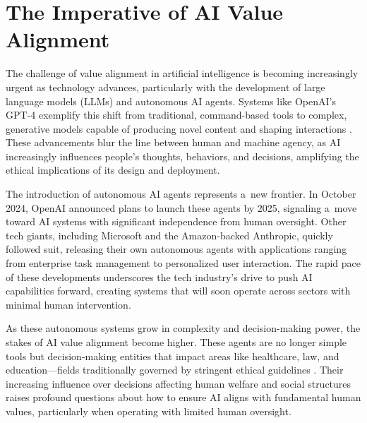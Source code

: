 \documentclass[%
  manuscript=article,
  year=2024,
  volume=77,
  doi=10.59203/zfn.77.707,
]{zfn}
\begin{document}
\section{The Imperative of AI Value Alignment}

The challenge of value alignment in artificial intelligence is becoming increasingly urgent as technology advances, particularly with the development of large language models (LLMs) and autonomous AI agents. Systems like OpenAI's GPT-4 exemplify this shift from traditional, command-based tools to complex, generative models capable of producing novel content and shaping interactions 
\parencite[][]{openai_gpt4_2024}. %
 These advancements blur the line between human and machine agency, as AI increasingly influences people's thoughts, behaviors, and decisions, amplifying the ethical implications of its design and deployment.



The introduction of autonomous AI agents represents a~new frontier. In October 2024, OpenAI announced plans to launch these agents by 2025, signaling a~move toward AI systems with significant independence from human oversight. Other tech giants, including Microsoft and the Amazon-backed Anthropic, quickly followed suit, releasing their own autonomous agents with applications ranging from enterprise task management to personalized user interaction. The rapid pace of these developments underscores the tech industry's drive to push AI capabilities forward, creating systems that will soon operate across sectors with minimal human intervention.



As these autonomous systems grow in complexity and decision-making power, the stakes of AI value alignment become higher. These agents are no longer simple tools but decision-making entities that impact areas like healthcare, law, and education---fields traditionally governed by stringent ethical guidelines 
\parencite[][]{coeckelbergh_ai_2020}. %
 Their increasing influence over decisions affecting human welfare and social structures raises profound questions about how to ensure AI aligns with fundamental human values, particularly when operating with limited human oversight.
\end{document}
